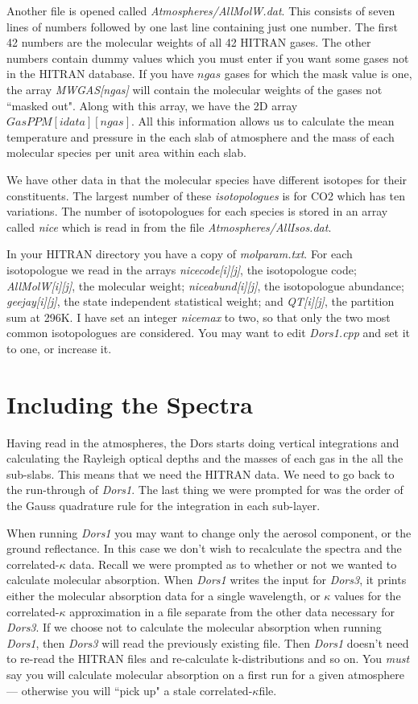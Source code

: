 \documentclass[12pt]{article}
\begin{document}
Another file is opened called {\it Atmospheres/AllMolW.dat}. This consists of seven
lines of numbers followed by one last line containing just one number. The first 42
numbers are the molecular weights of all 42 HITRAN gases. The other numbers
contain dummy values which you must enter if you want some gases not in the HITRAN
database. If you have $ngas$ gases for which the mask value is one, the array
{\it MWGAS[ngas]} will contain the molecular weights of the gases not ``masked out".
Along with this array, we have the  2D array $GasPPM[idata][ngas]$. All this information
allows us to calculate the mean temperature and pressure in the each slab of atmosphere
and the mass of each molecular species per unit area within each slab.

We have other data in that the molecular species have different isotopes for their constituents.
 The largest number of these {\it isotopologues} is for CO2 which has ten variations.
The number of isotopologues for each species is stored in an array called {\it nice} which
is read in from the file {\it Atmospheres/AllIsos.dat}.

In your {HITRAN} directory you have a copy of {\it molparam.txt}. For each isotopologue
we read in the arrays {\it nicecode[i][j]}, the isotopologue code; {\it AllMolW[i][j]}, the molecular
weight; {\it niceabund[i][j]}, the isotopologue abundance; {\it geejay[i][j]}, the state independent 
statistical weight; and {\it QT[i][j]}, the partition sum at 296K. I have set an integer {\it nicemax}
to two, so that only the two most common isotopologues are considered. You may want to edit
{\it Dors1.cpp} and set it to one, or increase it.


\section{Including the Spectra}

Having read in the atmospheres, the Dors starts doing vertical integrations and calculating
the Rayleigh optical depths and the masses of each gas in the all the sub-slabs. This
means that we need the HITRAN data. We need to go back to the run-through of {\it Dors1}.
The last thing we were prompted for was the order of the Gauss quadrature rule for the integration
in each sub-layer.

When running {\it Dors1} you may want to change only the aerosol component, or the ground reflectance.
In this case we don't wish to recalculate the spectra and the correlated-$\kappa$ data. Recall we
 were prompted as to whether or not we wanted to calculate molecular absorption.
When {\it Dors1} writes the input for {\it Dors3}, it prints either the molecular absorption
 data for a single wavelength,
 or $\kappa$ values for the correlated-$\kappa$ approximation in a file separate from the other data necessary for
{\it Dors3}. If we choose not to calculate the molecular absorption when running {\it Dors1}, then {\it Dors3} will read the previously
existing file.
Then {\it Dors1} doesn't need to re-read the HITRAN files and re-calculate k-distributions and so on.
 You {\it must}
say you will calculate molecular absorption on a first run for a given atmosphere  --- otherwise you
will ``pick up" a stale correlated-$\kappa$file.
\end{document}
